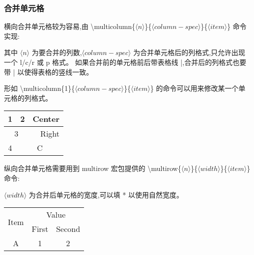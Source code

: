 \documentclass[a4paper]{ctexart}
\begin{document}
    \subsubsection{合并单元格}
    横向合并单元格较为容易,由 \textbackslash multicolumn\{$\langle n\rangle$\}\{$\langle column-spec\rangle$\}\{$\langle item\rangle$\} %
    命令实现:\par
    其中 $\langle n\rangle$ 为要合并的列数,$\langle column-spec\rangle$ 为合并单元格后的列格式,只允许出现一个 l/c/r 或 p 格式。%
    如果合并前的单元格前后带表格线 |,合并后的列格式也要带 | 以使得表格的竖线一致。\par
    形如 \textbackslash multicolumn\{1\}\{$\langle column-spec\rangle$\}\{$\langle item\rangle$\} %
    的命令可以用来修改某一个单元格的列格式。\par
    \begin{tabular}{|c|c|c|}
        \hline
        1 & 2 & Center \\
        \hline
        \multicolumn{2}{|c|}{3} & \multicolumn{1}{r|}{Right} \\
        \hline
        4 & \multicolumn{2}{c|}{C} \\
        \hline
    \end{tabular}\par
    纵向合并单元格需要用到 multirow 宏包提供的 %
    \textbackslash multirow\{$\langle n\rangle$\}\{$\langle width\rangle$\}\{$\langle item\rangle$\} 命令:\par
    $\langle width\rangle$ 为合并后单元格的宽度,可以填 * 以使用自然宽度。\par
    \begin{tabular}{ccc}
        \hline
        \multirow{2}{*}{Item} & \multicolumn{2}{c}{Value} \\ 
        \cline{2-3}
                              & First & Second \\
        \hline
                            A & 1     & 2 \\
        \hline 
    \end{tabular}
\end{document}
